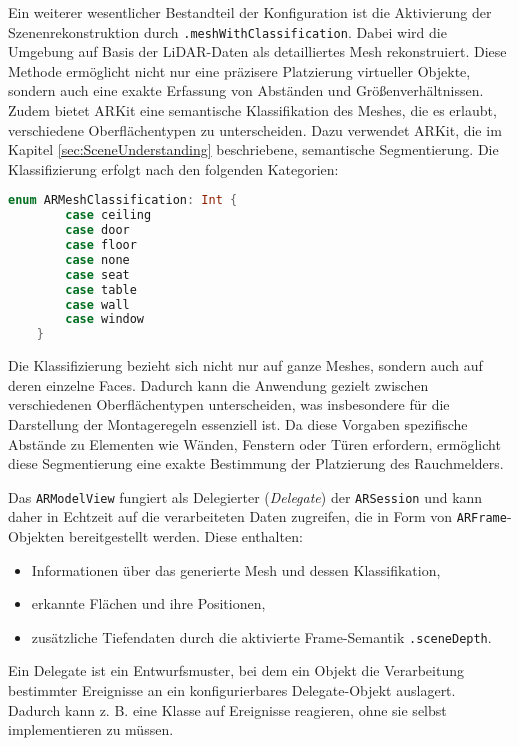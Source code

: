 Ein weiterer wesentlicher Bestandteil der Konfiguration ist die Aktivierung der Szenenrekonstruktion durch \texttt{.meshWithClassification}. Dabei wird die Umgebung auf Basis der LiDAR-Daten als detailliertes Mesh rekonstruiert. Diese Methode ermöglicht nicht nur eine präzisere Platzierung virtueller Objekte, sondern auch eine exakte Erfassung von Abständen und Größenverhältnissen. Zudem bietet ARKit eine semantische Klassifikation des Meshes, die es erlaubt, verschiedene Oberflächentypen zu unterscheiden. Dazu verwendet ARKit, die im Kapitel \ref{sec:SceneUnderstanding} beschriebene, semantische Segmentierung. Die Klassifizierung erfolgt nach den folgenden Kategorien:

\begin{lstlisting}[language=Swift]
    enum ARMeshClassification: Int {
        case ceiling
        case door
        case floor
        case none
        case seat
        case table  
        case wall
        case window
    }
\end{lstlisting}

Die Klassifizierung bezieht sich nicht nur auf ganze Meshes, sondern auch auf deren einzelne Faces. Dadurch kann die Anwendung gezielt zwischen verschiedenen Oberflächentypen unterscheiden, was insbesondere für die Darstellung der Montageregeln essenziell ist. Da diese Vorgaben spezifische Abstände zu Elementen wie Wänden, Fenstern oder Türen erfordern, ermöglicht diese Segmentierung eine exakte Bestimmung der Platzierung des Rauchmelders.

Das \texttt{ARModelView} fungiert als Delegierter (\emph{Delegate}) der \texttt{ARSession} und kann daher in Echtzeit auf die verarbeiteten Daten zugreifen, die in Form von \texttt{ARFrame}-Objekten bereitgestellt werden. Diese enthalten:

\begin{itemize}
    \item Informationen über das generierte Mesh und dessen Klassifikation,
    \item erkannte Flächen und ihre Positionen,
    \item zusätzliche Tiefendaten durch die aktivierte Frame-Semantik \texttt{.sceneDepth}.
\end{itemize}

\begin{tcolorbox}[colback=THAi-Blue!20!white, colframe=THAi-Blue]
    Ein Delegate ist ein Entwurfsmuster, bei dem ein Objekt die Verarbeitung bestimmter Ereignisse an ein konfigurierbares Delegate-Objekt auslagert. Dadurch kann z. B. eine Klasse auf Ereignisse reagieren, ohne sie selbst implementieren zu müssen. \cite{appledevdoc}
\end{tcolorbox}  

